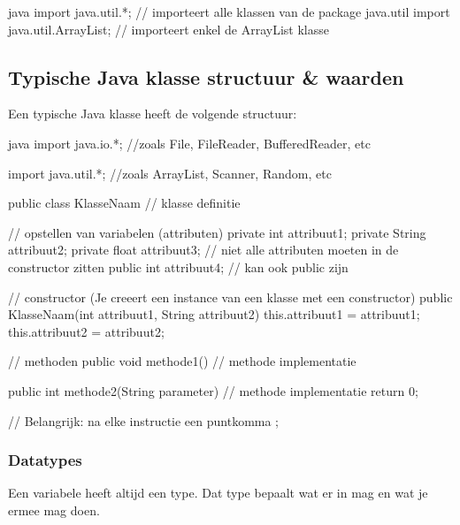 \documentclass[a4paper,11pt]{article}
\begin{document}
\begin{codeblock}{java}
    import java.util.*; // importeert alle klassen van de package java.util
    import java.util.ArrayList; // importeert enkel de ArrayList klasse
\end{codeblock}

\subsection{Typische Java klasse structuur \& waarden}
Een typische Java klasse heeft de volgende structuur:
\begin{codeblock}{java}
    import java.io.*; //zoals File, FileReader, BufferedReader, etc

    import java.util.*; //zoals ArrayList, Scanner, Random, etc


    public class KlasseNaam  // klasse definitie
        {
            // opstellen van variabelen (attributen)
            private int attribuut1;
            private String attribuut2;
            private float attribuut3; // niet alle attributen moeten in de constructor zitten
            public int attribuut4; // kan ook public zijn

            // constructor (Je creeert een instance van een klasse met een constructor)
            public KlasseNaam(int attribuut1, String attribuut2)
            {
                    this.attribuut1 = attribuut1;
                    this.attribuut2 = attribuut2;
                }

            // methoden
            public void methode1()
            {
                    // methode implementatie
                }

            public int methode2(String parameter)
            {
                    // methode implementatie
                    return 0;
                }

            // Belangrijk: na elke instructie een puntkomma ;
        }
\end{codeblock}

\subsubsection{Datatypes}
Een variabele heeft altijd een type. Dat type bepaalt wat er in mag en wat je
ermee mag doen.
\end{document}
